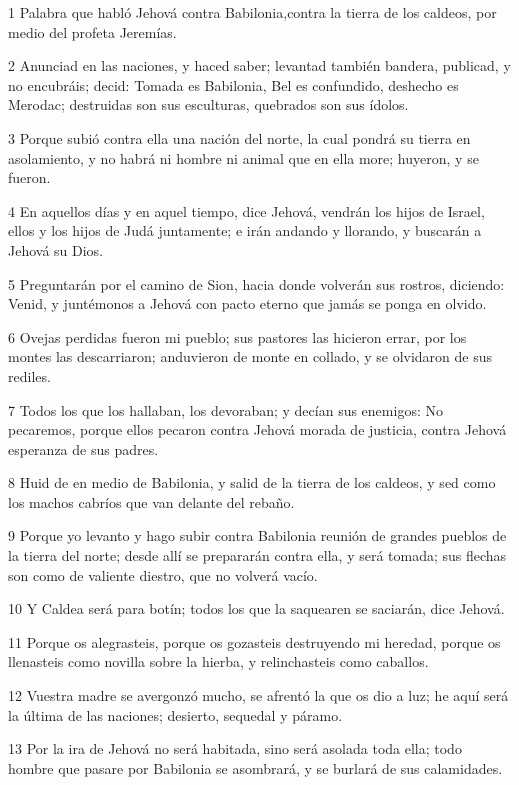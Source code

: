 \par 1 Palabra que habló Jehová contra Babilonia,contra la tierra de los caldeos, por medio del profeta Jeremías.
\par 2 Anunciad en las naciones, y haced saber; levantad también bandera, publicad, y no encubráis; decid: Tomada es Babilonia, Bel es confundido, deshecho es Merodac; destruidas son sus esculturas, quebrados son sus ídolos.
\par 3 Porque subió contra ella una nación del norte, la cual pondrá su tierra en asolamiento, y no habrá ni hombre ni animal que en ella more; huyeron, y se fueron.
\par 4 En aquellos días y en aquel tiempo, dice Jehová, vendrán los hijos de Israel, ellos y los hijos de Judá juntamente; e irán andando y llorando, y buscarán a Jehová su Dios.
\par 5 Preguntarán por el camino de Sion, hacia donde volverán sus rostros, diciendo: Venid, y juntémonos a Jehová con pacto eterno que jamás se ponga en olvido.
\par 6 Ovejas perdidas fueron mi pueblo; sus pastores las hicieron errar, por los montes las descarriaron; anduvieron de monte en collado, y se olvidaron de sus rediles.
\par 7 Todos los que los hallaban, los devoraban; y decían sus enemigos: No pecaremos, porque ellos pecaron contra Jehová morada de justicia, contra Jehová esperanza de sus padres.
\par 8 Huid de en medio de Babilonia, y salid de la tierra de los caldeos, y sed como los machos cabríos que van delante del rebaño.
\par 9 Porque yo levanto y hago subir contra Babilonia reunión de grandes pueblos de la tierra del norte; desde allí se prepararán contra ella, y será tomada; sus flechas son como de valiente diestro, que no volverá vacío.
\par 10 Y Caldea será para botín; todos los que la saquearen se saciarán, dice Jehová.
\par 11 Porque os alegrasteis, porque os gozasteis destruyendo mi heredad, porque os llenasteis como novilla sobre la hierba, y relinchasteis como caballos.
\par 12 Vuestra madre se avergonzó mucho, se afrentó la que os dio a luz; he aquí será la última de las naciones; desierto, sequedal y páramo.
\par 13 Por la ira de Jehová no será habitada, sino será asolada toda ella; todo hombre que pasare por Babilonia se asombrará, y se burlará de sus calamidades.
